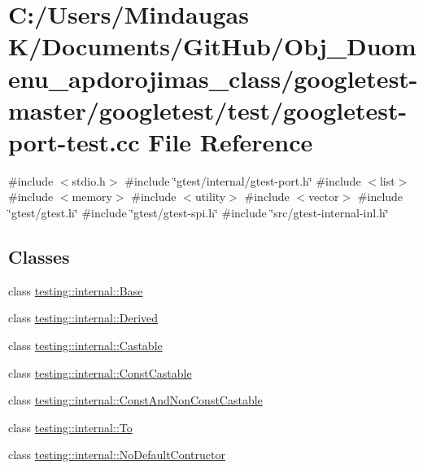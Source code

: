 \hypertarget{googletest-master_2googletest_2test_2googletest-port-test_8cc}{}\section{C\+:/\+Users/\+Mindaugas K/\+Documents/\+Git\+Hub/\+Obj\+\_\+\+Duomenu\+\_\+apdorojimas\+\_\+class/googletest-\/master/googletest/test/googletest-\/port-\/test.cc File Reference}
\label{googletest-master_2googletest_2test_2googletest-port-test_8cc}
{\ttfamily \#include $<$stdio.\+h$>$}\newline
{\ttfamily \#include \char`\"{}gtest/internal/gtest-\/port.\+h\char`\"{}}\newline
{\ttfamily \#include $<$list$>$}\newline
{\ttfamily \#include $<$memory$>$}\newline
{\ttfamily \#include $<$utility$>$}\newline
{\ttfamily \#include $<$vector$>$}\newline
{\ttfamily \#include \char`\"{}gtest/gtest.\+h\char`\"{}}\newline
{\ttfamily \#include \char`\"{}gtest/gtest-\/spi.\+h\char`\"{}}\newline
{\ttfamily \#include \char`\"{}src/gtest-\/internal-\/inl.\+h\char`\"{}}\newline
\subsection*{Classes}
\begin{DoxyCompactItemize}
\item 
class \mbox{\hyperlink{classtesting_1_1internal_1_1_base}{testing\+::internal\+::\+Base}}
\item 
class \mbox{\hyperlink{classtesting_1_1internal_1_1_derived}{testing\+::internal\+::\+Derived}}
\item 
class \mbox{\hyperlink{classtesting_1_1internal_1_1_castable}{testing\+::internal\+::\+Castable}}
\item 
class \mbox{\hyperlink{classtesting_1_1internal_1_1_const_castable}{testing\+::internal\+::\+Const\+Castable}}
\item 
class \mbox{\hyperlink{classtesting_1_1internal_1_1_const_and_non_const_castable}{testing\+::internal\+::\+Const\+And\+Non\+Const\+Castable}}
\item 
class \mbox{\hyperlink{classtesting_1_1internal_1_1_to}{testing\+::internal\+::\+To}}
\item 
class \mbox{\hyperlink{classtesting_1_1internal_1_1_no_default_contructor}{testing\+::internal\+::\+No\+Default\+Contructor}}
\end{DoxyCompactItemize}
